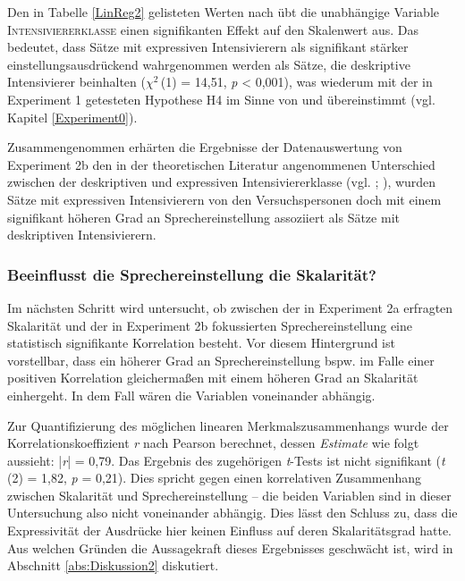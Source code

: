 \newpage
%
\noindent Den in Tabelle \ref{LinReg2} gelisteten Werten nach übt die unabhängige Variable {\textsc{Intensiviererklasse}} einen signifikanten Effekt auf den Skalenwert aus. Das bedeutet, dass Sätze mit expressiven Intensivierern als signifikant stärker einstellungsausdrückend wahrgenommen werden als Sätze, die deskriptive Intensivierer beinhalten {($\chi$$^{2}$\,(1) = 14,51, \textit{p} < 0,001)}, was wiederum mit der in Experiment 1 getesteten Hypothese H4 im Sinne von {\citet[315]{Lang.1983}} und \citet[57]{Ortner.2014} übereinstimmt (vgl. {Kapitel \ref{Experiment0}}).


Zusammengenommen erhärten die Ergebnisse der Datenauswertung von Experiment 2b den in der theoretischen Literatur angenommenen Unterschied zwischen der deskriptiven und expressiven Intensiviererklasse (vgl. \citealt[315]{Lang.1983}; \citealt[57]{Ortner.2014}), wurden Sätze mit expressiven Intensivierern von den Versuchspersonen doch mit einem signifikant höheren Grad an Sprechereinstellung assoziiert als Sätze mit deskriptiven Intensivierern.


\subsubsection[Einfluss von Sprechereinstellung auf Skalarität]{Beeinflusst die Sprechereinstellung die Skalarität?}


Im nächsten Schritt wird untersucht, ob zwischen der in Experiment 2a erfragten Skalarität und der in Experiment 2b fokussierten Sprechereinstellung eine statistisch signifikante Korrelation besteht. Vor diesem Hintergrund ist vorstellbar, dass ein höherer Grad an Sprechereinstellung bspw. im Falle einer positiven Korrelation gleichermaßen mit einem höheren Grad an Skalarität einhergeht. In dem Fall wären die Variablen voneinander abhängig.


Zur Quantifizierung des möglichen linearen Merkmalszusammenhangs wurde der Korrelationskoeffizient \textit{r} nach Pearson berechnet, dessen \textit{Estimate} wie folgt aussieht: |\textit{r}| = 0,79. Das Ergebnis des zugehörigen \textit{t}-Tests ist nicht signifikant ({\textit{t}\,(2) = 1,82}, \textit{p} = 0,21). Dies spricht gegen einen korrelativen Zusammenhang zwischen Skalarität und Sprechereinstellung -- die beiden Variablen sind in dieser Untersuchung also nicht voneinander abhängig. Dies lässt den Schluss zu, dass die Expressivität der Ausdrücke hier keinen Einfluss auf deren Skalaritätsgrad hatte. Aus welchen Gründen die Aussagekraft dieses Ergebnisses geschwächt ist, wird in Abschnitt \ref{abs:Diskussion2} {diskutiert}.


